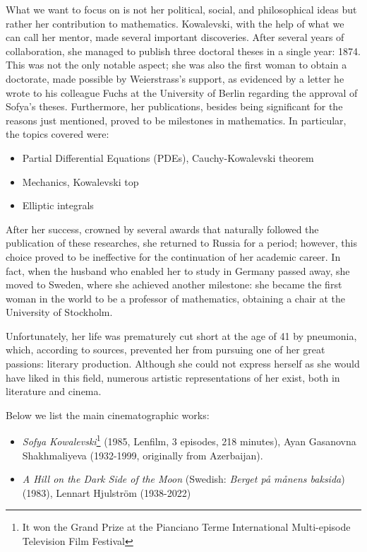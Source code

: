 What we want to focus on is not her political, social, and philosophical ideas but rather her contribution to mathematics. Kowalevski, with the help of what we can call her mentor, made several important discoveries. After several years of collaboration, she managed to publish three doctoral theses in a single year: 1874. This was not the only notable aspect; she was also the first woman to obtain a doctorate, made possible by Weierstrass's support, as evidenced by a letter he wrote to his colleague Fuchs at the University of Berlin regarding the approval of Sofya's theses. Furthermore, her publications, besides being significant for the reasons just mentioned, proved to be milestones in mathematics. In particular, the topics covered were:
\begin{itemize}
\item Partial Differential Equations (PDEs), Cauchy-Kowalevski theorem
\item Mechanics, Kowalevski top
\item Elliptic integrals
\end{itemize}

After her success, crowned by several awards that naturally followed the publication of these researches, she returned to Russia for a period; however, this choice proved to be ineffective for the continuation of her academic career. In fact, when the husband who enabled her to study in Germany passed away, she moved to Sweden, where she achieved another milestone: she became the first woman in the world to be a professor of mathematics, obtaining a chair at the University of Stockholm.

Unfortunately, her life was prematurely cut short at the age of 41 by pneumonia, which, according to sources, prevented her from pursuing one of her great passions: literary production. Although she could not express herself as she would have liked in this field, numerous artistic representations of her exist, both in literature and cinema.

Below we list the main cinematographic works:
\begin{itemize}
\emergencystretch 3em
\item \textit{Sofya Kowalevski}\footnote{It won the Grand Prize at the Pianciano Terme International Multi-episode Television Film Festival} (1985, Lenfilm, 3 episodes, 218 minutes), Ayan Gasanovna Shakhmaliyeva (1932-1999, originally from Azerbaijan).

\item \textit{A Hill on the Dark Side of the Moon} (Swedish: \textit{Berget på månens baksida})(1983), Lennart Hjulström (1938-2022)
\end{itemize}

